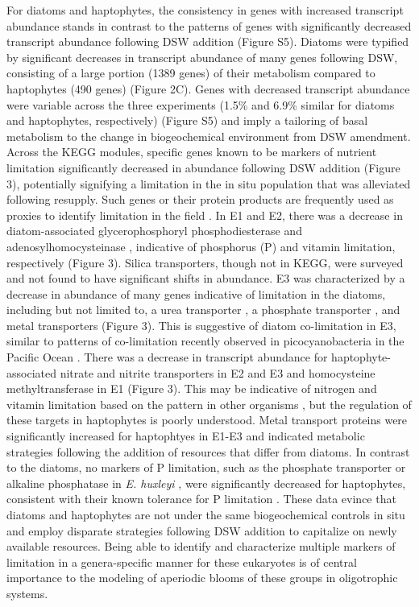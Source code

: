 For diatoms and haptophytes, the consistency in genes with increased transcript abundance stands in contrast to the patterns of genes with significantly decreased transcript abundance following DSW addition (Figure S5). Diatoms were typified by significant decreases in transcript abundance of many genes following DSW, consisting of a large portion (1389 genes) of their metabolism compared to haptophytes (490 genes) (Figure 2C). Genes with decreased transcript abundance were variable across the three experiments (1.5\% and 6.9\% similar for diatoms and haptophytes, respectively) (Figure S5) and imply a tailoring of basal metabolism to the change in biogeochemical environment from DSW amendment. Across the KEGG modules, specific genes known to be markers of nutrient limitation significantly decreased in abundance following DSW addition (Figure 3), potentially signifying a limitation in the in situ population that was alleviated following resupply. Such genes or their protein products are frequently used as proxies to identify limitation in the field \citep{Saito2014}. In E1 and E2, there was a decrease in diatom-associated glycerophosphoryl phosphodiesterase \citep{Dyhrman2012} and adenosylhomocysteinase \citep{Bertrand2012a}, indicative of phosphorus (P) and vitamin limitation, respectively (Figure 3). Silica transporters, though not in KEGG, were surveyed and not found to have significant shifts in abundance. E3 was characterized by a decrease in abundance of many genes indicative of limitation in the diatoms, including but not limited to, a urea transporter \citep{Bender2012}, a phosphate transporter \citep{Dyhrman2012}, and metal transporters (Figure 3). This is suggestive of diatom co-limitation in E3, similar to patterns of co-limitation recently observed in picocyanobacteria in the Pacific Ocean \citep{Saito2014}. There was a decrease in transcript abundance for haptophyte-associated nitrate and nitrite transporters in E2 and E3 and homocysteine methyltransferase in E1 (Figure 3). This may be indicative of nitrogen and vitamin limitation based on the pattern in other organisms \citep{Bertrand2012a, Bender2014}, but the regulation of these targets in haptophytes is poorly understood. Metal transport proteins were significantly increased for haptophtyes in E1-E3 and indicated metabolic strategies following the addition of resources that differ from diatoms. In contrast to the diatoms, no markers of P limitation, such as the phosphate transporter or alkaline phosphatase in \textit{E. huxleyi} \citep{Dyhrman2006, Dyhrman2003, Xu2006}, were significantly decreased for haptophytes, consistent with their known tolerance for P limitation \citep{Lessard2005}. These data evince that diatoms and haptophytes are not under the same biogeochemical controls in situ and employ disparate strategies following DSW addition to capitalize on newly available resources. Being able to identify and characterize multiple markers of limitation in a genera-specific manner for these eukaryotes is of central importance to the modeling of aperiodic blooms of these groups in oligotrophic systems. \par 
